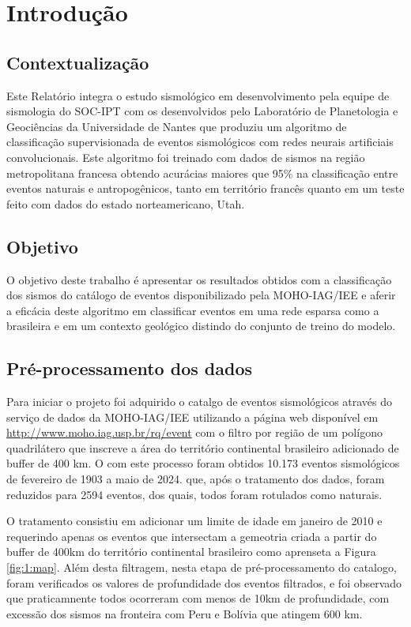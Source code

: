 \section{Introdução}

\subsection{Contextualização}
\par{
    Este Relatório integra o estudo sismológico em desenvolvimento pela equipe de sismologia do SOC-IPT com os desenvolvidos pelo Laboratório de Planetologia e Geociências da Universidade de Nantes que produziu um algoritmo de classificação supervisionada de eventos sismológicos com redes neurais artificiais convolucionais. Este algoritmo foi treinado com dados de sismos na região metropolitana francesa obtendo acurácias maiores que 95\% na classificação entre eventos naturais e antropogênicos, tanto em território francês quanto em um teste feito com dados do estado norteamericano, Utah.
}

\subsection{Objetivo}
\par{
    O objetivo deste trabalho é apresentar os resultados obtidos com a classificação dos sismos do catálogo de eventos disponibilizado pela MOHO-IAG/IEE e aferir a eficácia deste algoritmo em classificar eventos em uma rede esparsa como a brasileira e em um contexto geológico distindo do conjunto de treino do modelo.
}

\subsection{Pré-processamento dos dados}

\par{
    Para iniciar o projeto foi adquirido o catalgo de eventos sismológicos através do serviço de dados da MOHO-IAG/IEE utilizando a página web disponível em \url{http://www.moho.iag.usp.br/rq/event} com o filtro por região de um polígono quadrilátero que inscreve a área do território continental brasileiro adicionado de buffer de 400 km. O com este processo foram obtidos 10.173 eventos sismológicos de fevereiro de 1903 a maio de 2024. que, após o tratamento dos dados, foram reduzidos para 2594 eventos, dos quais, todos foram rotulados como naturais.
}

\par{
    O tratamento consistiu em adicionar um limite de idade em janeiro de 2010 e requerindo apenas os eventos que intersectam a gemeotria criada a partir do buffer de 400km do território continental brasileiro como aprenseta a Figura \ref{fig:1:map}. Além desta filtragem, nesta etapa de pré-processamento do catalogo, foram verificados os valores de profundidade dos eventos filtrados, e foi observado que praticamnente todos ocorreram com menos de 10km de profundidade, com excessão dos sismos na fronteira com Peru e Bolívia que atingem 600 km.
}

